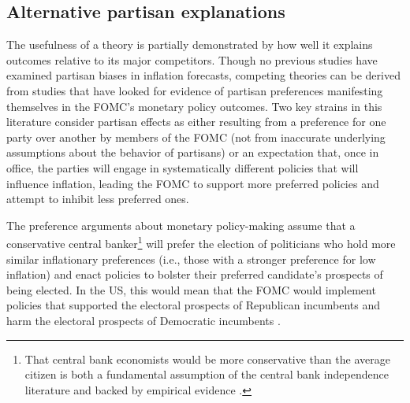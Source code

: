 \documentclass[a4paper]{article}
\begin{document}

\subsection{Alternative partisan explanations}

The usefulness of a theory is partially demonstrated by how well it explains outcomes relative to its major competitors. Though no previous studies have examined partisan biases in inflation forecasts, competing theories can be derived from studies that have looked for evidence of partisan preferences manifesting themselves in the FOMC's monetary policy outcomes. Two key strains in this literature consider partisan effects as either resulting from a preference for one party over another by members of the FOMC (not from inaccurate underlying assumptions about the behavior of partisans) or an expectation that, once in office, the parties will engage in systematically different policies that will influence inflation, leading the FOMC to support more preferred policies and attempt to inhibit less preferred ones.

The preference arguments about monetary policy-making assume that a conservative central banker\footnote{That central bank economists would be more conservative than the average citizen is both a fundamental assumption of the central bank independence literature \citep[e.g.][]{Goodman1991} and backed by empirical evidence \citep[e.g.,][]{Scott1975,Stigler1959}.} will prefer the election of politicians who hold more similar inflationary preferences (i.e., those with a stronger preference for low inflation) and enact policies to bolster their preferred candidate's prospects of being elected. In the US, this would mean that the FOMC would implement policies that supported the electoral prospects of Republican incumbents and harm the electoral prospects of Democratic incumbents \citep{Clark2012,Hakes1988,Sieg1997,Tootell1996}.
\end{document}
